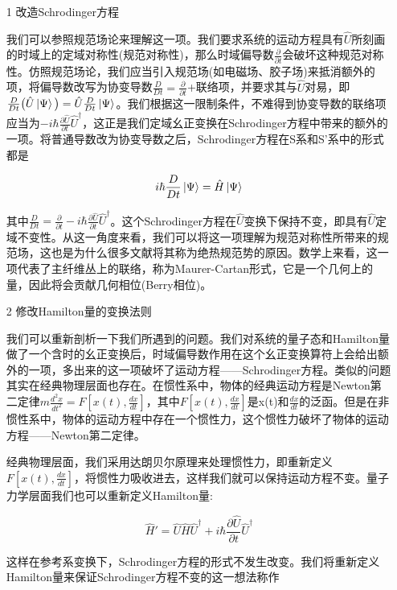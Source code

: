 \documentclass[a4paper]{article}
\begin{document}
        \begin{itemize}
            \item[1] 改造Schrodinger方程
                
                我们可以参照规范场论来理解这一项。我们要求系统的运动方程具有$\hat{U}$所刻画的时域上的定域对称性(规范对称性)，那么时域偏导数$\frac{\partial}{\partial t}$会破坏这种规范对称性。仿照规范场论，我们应当引入规范场(如电磁场、胶子场)来抵消额外的项，将偏导数改写为协变导数$\frac{D}{Dt}=\frac{\partial}{\partial t}$+联络项，并要求其与$\hat{U}$对易，即$\frac{D}{Dt}\big(\hat{U}\ket{\Psi}\big)=\hat{U}\frac{D}{Dt}\ket{\Psi}$。我们根据这一限制条件，不难得到协变导数的联络项应当为$-i\hbar\frac{\partial\hat{U}}{\partial t}\hat{U}^\dagger$，这正是我们定域幺正变换在Schrodinger方程中带来的额外的一项。将普通导数改为协变导数之后，Schrodinger方程在S系和S'系中的形式都是
    
                \begin{equation}
                    i\hbar\frac{D}{Dt}\ket{\Psi} = \hat{H}\ket{\Psi}
                \end{equation}
    
                其中$\frac{D}{Dt}=\frac{\partial}{\partial t}-i\hbar\frac{\partial\hat{U}}{\partial t}\hat{U}^\dagger$。这个Schrodinger方程在$\hat{U}$变换下保持不变，即具有$\hat{U}$定域不变性。从这一角度来看，我们可以将这一项理解为规范对称性所带来的规范场，这也是为什么很多文献将其称为绝热规范势的原因。数学上来看，这一项代表了主纤维丛上的联络，称为Maurer-Cartan形式，它是一个几何上的量，因此将会贡献几何相位(Berry相位)。
            
            \item[2] 修改Hamilton量的变换法则
                
                我们可以重新剖析一下我们所遇到的问题。我们对系统的量子态和Hamilton量做了一个含时的幺正变换后，时域偏导数作用在这个幺正变换算符上会给出额外的一项，多出来的这一项破坏了运动方程——Schrodinger方程。类似的问题其实在经典物理层面也存在。在惯性系中，物体的经典运动方程是Newton第二定律$m\frac{d^2x}{dt^2}=F[x(t),\frac{dx}{dt}]$，其中$F[x(t),\frac{dx}{dt}]$是x(t)和$\frac{dx}{dt}$的泛函。但是在非惯性系中，物体的运动方程中存在一个惯性力，这个惯性力破坏了物体的运动方程——Newton第二定律。
    
                经典物理层面，我们采用达朗贝尔原理来处理惯性力，即重新定义$F[x(t),\frac{dx}{dt}]$，将惯性力吸收进去，这样我们就可以保持运动方程不变。量子力学层面我们也可以重新定义Hamilton量:
                
                \begin{equation}
                    \hat{H}'=\hat{U}\hat{H}\hat{U}^\dagger + i\hbar\frac{\partial\hat{U}}{\partial t}\hat{U}^\dagger
                \end{equation}
    
                这样在参考系变换下，Schrodinger方程的形式不发生改变。我们将重新定义Hamilton量来保证Schrodinger方程不变的这一想法称作
                
            \end{itemize}
        
\end{document}
